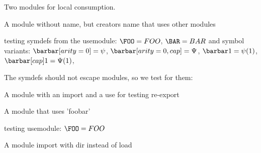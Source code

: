 \documentclass[minimal]{omdoc}
\begin{document}
Two modules for local consumption.

A module without name, but creators name that uses other modules
\begin{module}[creators=miko]
  testing symdefs from the usemodule: $\FOO=FOO$, $\BAR=BAR$
  and symbol variants: $\barbar[arity=0]=\psi$, $\barbar[arity=0,cap]=\Psi$, $\barbar1=\psi(1)$, $\barbar[cap]1=\Psi(1)$, 
\end{module}

The symdefs should not escape modules, so we test for them:
\ifx\FOO\undefined\else{}\fi

A module with an import and a use for testing re-export
\begin{module}[name=foobar]
\end{module}

A module  that uses 'foobar'
\begin{module}
  testing usemodule: $\FOO=FOO$
  \ifx\BAR\undefined\else{}\fi
\end{module}

A module import with dir instead of load
\begin{module}[name=foobarbar]
\end{module}
\end{document}
